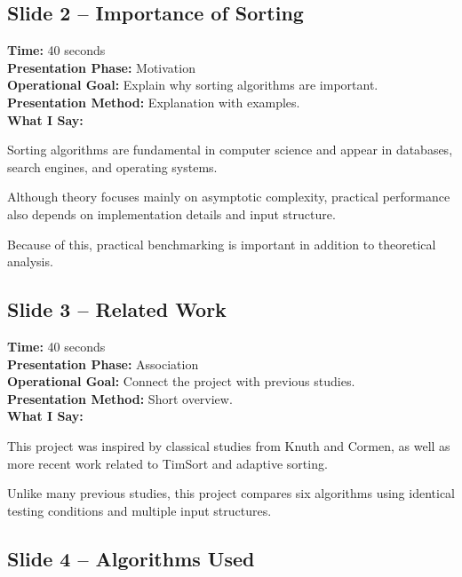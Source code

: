 \documentclass[12pt]{article}
\begin{document}
\subsection*{Slide 2 -- Importance of Sorting}

\textbf{Time:} 40 seconds\\
\textbf{Presentation Phase:} Motivation\\
\textbf{Operational Goal:} Explain why sorting algorithms are important.\\
\textbf{Presentation Method:} Explanation with examples.\\

\textbf{What I Say:}

Sorting algorithms are fundamental in computer science and appear in databases, search engines, and operating systems.

Although theory focuses mainly on asymptotic complexity, practical performance also depends on implementation details and input structure.

Because of this, practical benchmarking is important in addition to theoretical analysis.

\vspace{0.4cm}

\subsection*{Slide 3 -- Related Work}

\textbf{Time:} 40 seconds\\
\textbf{Presentation Phase:} Association\\
\textbf{Operational Goal:} Connect the project with previous studies.\\
\textbf{Presentation Method:} Short overview.\\

\textbf{What I Say:}

This project was inspired by classical studies from Knuth and Cormen, as well as more recent work related to TimSort and adaptive sorting.

Unlike many previous studies, this project compares six algorithms using identical testing conditions and multiple input structures.

\vspace{0.4cm}

\subsection*{Slide 4 -- Algorithms Used}
\end{document}
